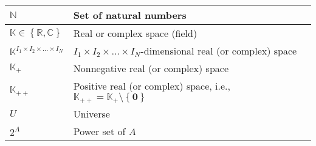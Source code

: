 \documentclass{article}
\begin{document}
\begin{xltabular}{\textwidth}{XX}
	\(\mathbb{N}\)                                             & Set of natural numbers                                                                                                                             \\ \hline
	\(\mathbb{K} \in \left\{ \mathbb{R}, \mathbb{C} \right\}\) & Real or complex space (field)                                                                                                                      \\ \hline
	\(\mathbb{K}^{I_1\times I_2 \times \dots \times I_N}\)     & \(I_1\times I_2 \times \dots \times I_N\)-dimensional real (or complex) space                                                                      \\ \hline
	\(\mathbb{K}_{+}\)                                         & Nonnegative real (or complex) space \cite{boydConvexOptimization2004}                                                                              \\ \hline
	\(\mathbb{K}_{++}\)                                        & Positive real (or complex) space, i.e., \(\mathbb{K}_{++} = \mathbb{K}_{+}\setminus\left\{ \mathbf{0} \right\}\) \cite{boydConvexOptimization2004} \\ \hline
	\(U\)                                                      & Universe                                                                                                                                           \\ \hline
	\(2^A\)                                                    & Power set of \(A\)                                                                                                                                 \\ \hline
\end{xltabular}
\end{document}
